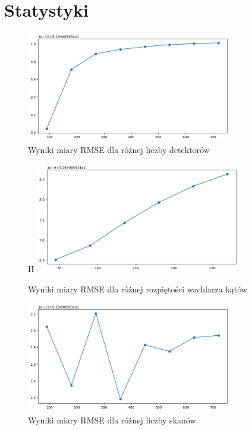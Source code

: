 \documentclass[11pt,a4paper]{article}
\begin{document}
    \section{Statystyki}
    \begin{figure}[H]
        \centering
        \includegraphics[width=0.8\textwidth]{rmse_detectors}
        \caption{Wyniki miary RMSE dla różnej liczby detektorów}
    \end{figure}

    \begin{figure}{H}
        \centering
        \includegraphics[width=0.8\textwidth]{mse_fan}
        \caption{Wyniki miary RMSE dla różnej rozpiętości wachlarza kątów}
    \end{figure}

    \begin{figure}[H]
        \centering
        \includegraphics[width=0.8\textwidth]{mse_amount}
        \caption{Wyniki miary RMSE dla różnej liczby skanów}
    \end{figure}
\end{document}
